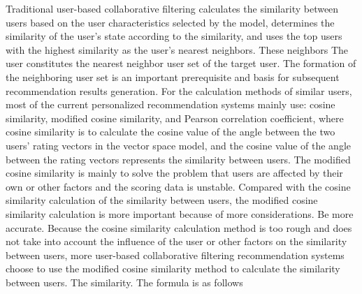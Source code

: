 Traditional user-based collaborative filtering calculates the similarity between users based on the user characteristics selected by the model, determines the similarity of the user's state according to the similarity, and uses the top users with the highest similarity as the user's nearest neighbors. These neighbors The user constitutes the nearest neighbor user set of the target user. The formation of the neighboring user set is an important prerequisite and basis for subsequent recommendation results generation. For the calculation methods of similar users, most of the current personalized recommendation systems mainly use: cosine similarity, modified cosine similarity, and Pearson correlation coefficient\cite{Novotn2018Cosinemeasure}, where cosine similarity is to calculate the cosine value of the angle between the two users' rating vectors in the vector space model, and the cosine value of the angle between the rating vectors represents the similarity between users. The modified cosine similarity is mainly to solve the problem that users are affected by their own or other factors and the scoring data is unstable. Compared with the cosine similarity calculation of the similarity between users, the modified cosine similarity calculation is more important because of more considerations. Be more accurate. Because the cosine similarity calculation method is too rough and does not take into account the influence of the user or other factors on the similarity between users, more user-based collaborative filtering recommendation systems choose to use the modified cosine similarity method to calculate the similarity between users. The similarity. The formula is as follows

